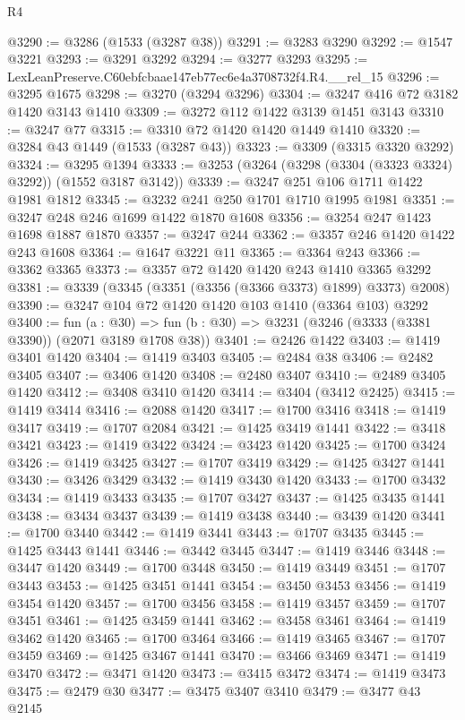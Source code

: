 \begin{lexlean}{R4}
\begin{coremodule}
@3290 := @3286 (@1533 (@3287 @38))
@3291 := @3283 @3290
@3292 := @1547 @3221
@3293 := @3291 @3292
@3294 := @3277 @3293
@3295 := LexLeanPreserve.C60ebfcbaae147eb77ec6e4a3708732f4.R4.__rel_15
@3296 := @3295 @1675
@3298 := @3270 (@3294 @3296)
@3304 := @3247 @416 @72 @3182 @1420 @3143 @1410
@3309 := @3272 @112 @1422 @3139 @1451 @3143
@3310 := @3247 @77
@3315 := @3310 @72 @1420 @1420 @1449 @1410
@3320 := @3284 @43 @1449 (@1533 (@3287 @43))
@3323 := @3309 (@3315 @3320 @3292)
@3324 := @3295 @1394
@3333 := @3253 (@3264 (@3298 (@3304 (@3323 @3324) @3292)) (@1552 @3187 @3142))
@3339 := @3247 @251 @106 @1711 @1422 @1981 @1812
@3345 := @3232 @241 @250 @1701 @1710 @1995 @1981
@3351 := @3247 @248 @246 @1699 @1422 @1870 @1608
@3356 := @3254 @247 @1423 @1698 @1887 @1870
@3357 := @3247 @244
@3362 := @3357 @246 @1420 @1422 @243 @1608
@3364 := @1647 @3221 @11
@3365 := @3364 @243
@3366 := @3362 @3365
@3373 := @3357 @72 @1420 @1420 @243 @1410 @3365 @3292
@3381 := @3339 (@3345 (@3351 (@3356 (@3366 @3373) @1899) @3373) @2008)
@3390 := @3247 @104 @72 @1420 @1420 @103 @1410 (@3364 @103) @3292
@3400 := fun (a : @30) =>
  fun (b : @30) => @3231 (@3246 (@3333 (@3381 @3390)) (@2071 @3189 @1708 @38))
@3401 := @2426 @1422
@3403 := @1419 @3401 @1420
@3404 := @1419 @3403
@3405 := @2484 @38
@3406 := @2482 @3405
@3407 := @3406 @1420
@3408 := @2480 @3407
@3410 := @2489 @3405 @1420
@3412 := @3408 @3410 @1420
@3414 := @3404 (@3412 @2425)
@3415 := @1419 @3414
@3416 := @2088 @1420
@3417 := @1700 @3416
@3418 := @1419 @3417
@3419 := @1707 @2084
@3421 := @1425 @3419 @1441
@3422 := @3418 @3421
@3423 := @1419 @3422
@3424 := @3423 @1420
@3425 := @1700 @3424
@3426 := @1419 @3425
@3427 := @1707 @3419
@3429 := @1425 @3427 @1441
@3430 := @3426 @3429
@3432 := @1419 @3430 @1420
@3433 := @1700 @3432
@3434 := @1419 @3433
@3435 := @1707 @3427
@3437 := @1425 @3435 @1441
@3438 := @3434 @3437
@3439 := @1419 @3438
@3440 := @3439 @1420
@3441 := @1700 @3440
@3442 := @1419 @3441
@3443 := @1707 @3435
@3445 := @1425 @3443 @1441
@3446 := @3442 @3445
@3447 := @1419 @3446
@3448 := @3447 @1420
@3449 := @1700 @3448
@3450 := @1419 @3449
@3451 := @1707 @3443
@3453 := @1425 @3451 @1441
@3454 := @3450 @3453
@3456 := @1419 @3454 @1420
@3457 := @1700 @3456
@3458 := @1419 @3457
@3459 := @1707 @3451
@3461 := @1425 @3459 @1441
@3462 := @3458 @3461
@3464 := @1419 @3462 @1420
@3465 := @1700 @3464
@3466 := @1419 @3465
@3467 := @1707 @3459
@3469 := @1425 @3467 @1441
@3470 := @3466 @3469
@3471 := @1419 @3470
@3472 := @3471 @1420
@3473 := @3415 @3472
@3474 := @1419 @3473
@3475 := @2479 @30
@3477 := @3475 @3407 @3410
@3479 := @3477 @43 @2145

\end{coremodule}
\end{lexlean}
